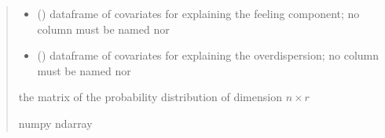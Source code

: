 \documentclass[letterpaper,10pt,english]{sphinxmanual}
\begin{document}
\begin{fulllineitems}
\begin{quote}
\begin{description}
\begin{itemize}
\item {} 
\sphinxAtStartPar
{} () \textendash{} dataframe of covariates for explaining the feeling component;
no column must be named  nor 

\item {} 
\sphinxAtStartPar
{} () \textendash{} dataframe of covariates for explaining the overdispersion;
no column must be named  nor 

\end{itemize}

\sphinxAtStartPar
the matrix of the probability distribution of dimension \(n \times r\)

\sphinxAtStartPar
numpy ndarray

\end{description}\end{quote}

\end{fulllineitems}

\end{document}
